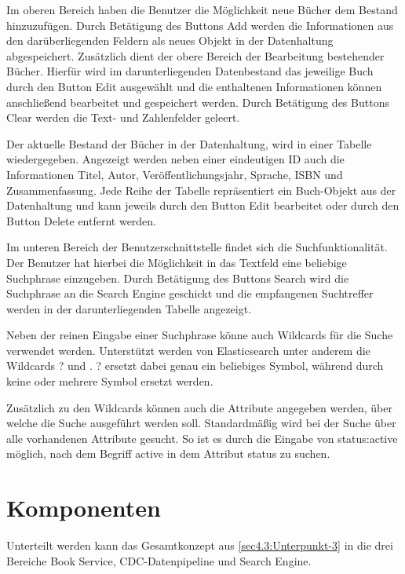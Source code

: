 Im oberen Bereich haben die Benutzer die Möglichkeit neue Bücher dem Bestand hinzuzufügen. Durch Betätigung des Buttons \glqq Add\grqq{} werden die Informationen aus den darüberliegenden Feldern als neues Objekt in der Datenhaltung abgespeichert. Zusätzlich dient der obere Bereich der Bearbeitung bestehender Bücher. Hierfür wird im darunterliegenden Datenbestand das jeweilige Buch durch den Button \glqq Edit\grqq{} ausgewählt und die enthaltenen Informationen können anschließend bearbeitet und gespeichert werden. Durch Betätigung des Buttons \glqq Clear\grqq{} werden die Text- und Zahlenfelder geleert.

Der aktuelle Bestand der Bücher in der Datenhaltung, wird in einer Tabelle wiedergegeben. Angezeigt werden neben einer eindeutigen ID auch die Informationen Titel, Autor, Veröffentlichungsjahr, Sprache, ISBN und Zusammenfassung. Jede Reihe der Tabelle repräsentiert ein Buch-Objekt aus der Datenhaltung und kann jeweils durch den Button \glqq Edit\grqq{} bearbeitet oder durch den Button \glqq Delete\grqq{} entfernt werden.

Im unteren Bereich der Benutzerschnittstelle findet sich die Suchfunktionalität. Der Benutzer hat hierbei die Möglichkeit in das Textfeld eine beliebige Suchphrase einzugeben. Durch Betätigung des Buttons \glqq Search\grqq{} wird die Suchphrase an die Search Engine geschickt und die empfangenen Suchtreffer werden in der darunterliegenden Tabelle angezeigt.

Neben der reinen Eingabe einer Suchphrase könne auch Wildcards für die Suche verwendet werden. Unterstützt werden von Elasticsearch unter anderem die Wildcards \glqq ?\grqq{} und \glqq *\grqq{}. \glqq ?\grqq{} ersetzt dabei genau ein beliebiges Symbol, während durch \glqq *\grqq{} keine oder mehrere Symbol ersetzt werden.

Zusätzlich zu den Wildcards können auch die Attribute angegeben werden, über welche die Suche ausgeführt werden soll. Standardmäßig wird bei der Suche über alle vorhandenen Attribute gesucht. So ist es durch die Eingabe von \glqq status:active\grqq{} möglich, nach dem Begriff \glqq active\grqq{} in dem Attribut \glqq status\grqq{} zu suchen.

\section{Komponenten\label{sec5.2:Unterpunkt-2}}

Unterteilt werden kann das Gesamtkonzept aus \autoref{sec4.3:Unterpunkt-3} in die drei Bereiche \glqq Book Service\grqq{}, \glqq CDC-Datenpipeline\grqq{} und \glqq Search Engine\grqq{}.

